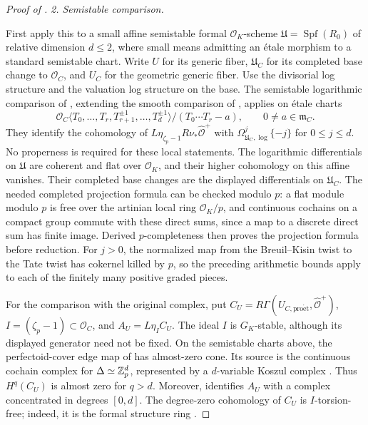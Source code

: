 \begin{proof}[Proof of ]
\medskip\noindent\emph{2. Semistable comparison.}
\par\noindent First apply this to a small affine semistable formal $\mathcal O_K$-scheme
$\mathfrak U=\operatorname{Spf}(R_0)$ of relative dimension $d\leq2$,
where small means admitting an \'etale morphism to a standard semistable chart.
Write $U$ for its generic fiber, $\mathfrak U_C$ for its completed base
change to $\mathcal O_C$, and $U_C$ for the geometric generic fiber. Use the divisorial log
structure and the valuation log structure on the base. The
semistable logarithmic comparison of
\cite[Sections~1.5--1.6 and Theorem~4.11]{CK}, extending the smooth
comparison of \cite[Theorem~8.3]{BMS}, applies on \'etale charts
\[
 \mathcal O_C\langle T_0,\ldots,T_r,
             T_{r+1}^{\pm1},\ldots,T_d^{\pm1}\rangle/
             (T_0\cdots T_r-a),\qquad 0\ne a\in\mathfrak m_C.
\]
They identify the cohomology of
$L\eta_{\zeta_p-1}R\nu_*\widehat{\mathcal O}^{+}$ with
$\Omega^j_{\mathfrak U_C,\log}\{-j\}$ for $0\leq j\leq d$.
No properness is required for these local statements.
The logarithmic differentials on $\mathfrak U$ are coherent and flat
over $\mathcal O_K$, and their higher cohomology on this affine
vanishes. Their completed base changes are the displayed
differentials on $\mathfrak U_C$.
The needed completed projection formula can be checked modulo
$p$: a flat module modulo $p$ is free over the artinian local
ring $\mathcal O_K/p$, and continuous cochains on a compact group
commute with these direct sums, since a map to a discrete direct
sum has finite image.  Derived $p$-completeness then proves the
projection formula before reduction.  For $j>0$, the normalized
map from the Breuil--Kisin twist to the Tate twist has cokernel
killed by $p$, so the preceding arithmetic bounds apply to each
of the finitely many positive graded pieces.

For the comparison with the original complex, put
$C_U=R\Gamma(U_{C,\mathrm{pro\acute et}},\widehat{\mathcal O}^{+})$,
$I=(\zeta_p-1)\subset\mathcal O_C$, and $A_U=L\eta_I C_U$.
The ideal $I$ is $G_K$-stable, although its displayed generator need not
be fixed.  On the semistable charts above, the perfectoid-cover edge map
of \cite[Section~3.3, Equation~(3.3.1)]{CK} has almost-zero cone.
Its source is the continuous cochain complex for
$\Delta\simeq\mathbb Z_p^d$, represented by a $d$-variable Koszul complex
\cite[Lemma~3.7]{CK}.  Thus $H^q(C_U)$ is almost zero for $q>d$.
Moreover, \cite[Theorems~3.9 and 4.11]{CK} identifies $A_U$ with a
complex concentrated in degrees $[0,d]$.  The degree-zero cohomology
of $C_U$ is $I$-torsion-free; indeed, it is the formal structure ring
\cite[Proposition~4.4]{CK}.


\end{proof}
